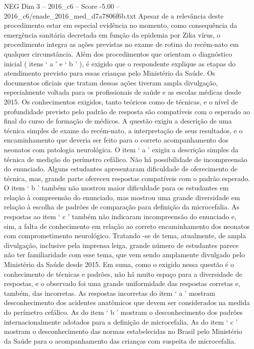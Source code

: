 \begin{textsample}{NEG Dim 3 – 2016\_c6 – Score -5.00 – 2016\_c6/enade\_2016\_med\_d7a7806f6b.txt}
Apesar de a relevância deste procedimento estar em especial evidência no momento, como consequência da emergência sanitária decretada em função da epidemia por Zika vírus, o procedimento integra as ações previstas no exame de rotina do recém-nato em qualquer circunstância.
Além dos procedimentos que orientam o diagnóstico inicial ( itens ‘ a ’ e ‘ b ’ ), é exigido que o respondente explique as etapas do atendimento previsto para essas crianças pelo Ministério da Saúde.
Os documentos oficiais que tratam dessas ações tiveram ampla divulgação, especialmente voltada para os profissionais de saúde e as escolas médicas desde 2015.
Os conhecimentos exigidos, tanto teóricos como de técnicas, e o nível de profundidade previsto pelo padrão de resposta são compatíveis com o esperado ao final do curso de formação de médicos.
A questão exigiu a descrição de uma técnica simples de exame do recém-nato, a interpretação de seus resultados, e o encaminhamento que deveria ser feito para o correto acompanhamento dos neonatos com patologia neurológica.
O item ‘ a ’ exigiu a descrição simples da técnica de medição do perímetro cefálico.
Não há possibilidade de incompreensão do enunciado.
Alguns estudantes apresentaram dificuldade de oferecimento de técnica, mas, grande parte ofereceu respostas compatíveis com o padrão esperado.
O item ‘ b ’ também não mostrou maior dificuldade para os estudantes em relação à compreensão do enunciado, mas mostrou uma grande diversidade em relação à escolha de padrões de comparação para definição da microcefalia.
As respostas ao item ‘ c ’ também não indicaram incompreensão do enunciado e, sim, a falta de conhecimento em relação ao correto encaminhamento dos neonatos com comprometimento neurológico.
Tratando -se de tema, atualmente, de ampla divulgação, inclusive pela imprensa leiga, grande número de estudantes parece não ter familiaridade com esse tema, que vem sendo amplamente divulgado pelo Ministério da Saúde desde 2015.
Em suma, como o exigido nessa questão é o conhecimento de técnicas e padrões, não há muito espaço para a diversidade de respostas, e o observado foi uma grande uniformidade das respostas corretas e, também, das incorretas.
As respostas incorretas do item ‘ a ’ mostram desconhecimento dos acidentes anatômicos que devem ser considerados na medida do perímetro cefálico.
As do item ‘ b ’ mostram o desconhecimento dos padrões internacionalmente adotados para a definição de microcefalia.
As do item ‘ c ’ mostram o desconhecimento das normas estabelecidas no Brasil pelo Ministério da Saúde para o acompanhamento das crianças com suspeita de microcefalia.

\end{textsample}
